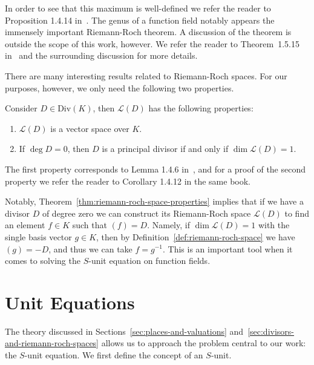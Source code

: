 In order to see that this maximum is well-defined we refer the reader to Proposition 1.4.14 in~\cite{stichtenoth-2009-algebraic-function-fields}. The genus of a function field notably appears the immensely important Riemann-Roch theorem. A discussion of the theorem is outside the scope of this work, however. We refer the reader to Theorem~1.5.15 in~\cite{stichtenoth-2009-algebraic-function-fields} and the surrounding discussion for more details.

There are many interesting results related to Riemann-Roch spaces. For our purposes, however, we only need the following two properties.

\begin{theorem}%
  \label{thm:riemann-roch-space-properties}
  Consider \(D \in \mathrm{Div}(K)\), then \(\mathcal{L}(D)\) has the following properties:
  \begin{enumerate}[label = {(\arabic*)}]
    \item%
      \label{prop:vector-space}
      \(\mathcal{L}(D)\) is a vector space over \(K\).

    \item%
      \label{prop:principal-dimension}
      If \(\deg{D} = 0\), then \(D\) is a principal divisor if and only if \(\dim{\mathcal{L}(D)} = 1\).
  \end{enumerate}
\end{theorem}

The first property corresponds to Lemma 1.4.6 in~\cite{stichtenoth-2009-algebraic-function-fields}, and for a proof of the second property we refer the reader to Corollary 1.4.12 in the same book.

Notably, Theorem~\ref{thm:riemann-roch-space-properties} implies that if we have a divisor \(D\) of degree zero we can construct its Riemann-Roch space \(\mathcal{L}(D)\) to find an element \(f \in K\) such that \((f) = D\). Namely, if \(\dim{\mathcal{L}(D)} = 1\) with the single basis vector \(g \in K\), then by Definition~\ref{def:riemann-roch-space} we have \((g) = -D\), and thus we can take \(f = g^{-1}\). This is an important tool when it comes to solving the \(S\)-unit equation on function fields.

\section{Unit Equations}%
\label{sec:unit-equations}

The theory discussed in Sections~\ref{sec:places-and-valuations} and~\ref{sec:divisors-and-riemann-roch-spaces} allows us to approach the problem central to our work: the \(S\)-unit equation. We first define the concept of an \(S\)-unit.

